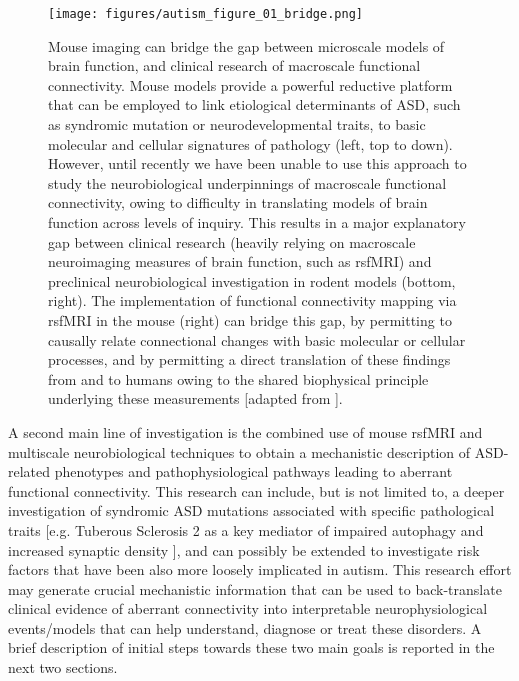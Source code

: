 \begin{figure}[th] \centering
    \texttt{[image: figures/autism\_figure\_01\_bridge.png]}
    \decoRule
    \caption[Mouse imaging can bridge
    the gap between microscale models of brain function, and clinical research
    of macroscale functional connectivity.]{Mouse imaging can bridge
    the gap between microscale models of brain function, and clinical research
    of macroscale functional connectivity. Mouse models provide a powerful
    reductive platform that can be employed to link etiological determinants of
    ASD, such as syndromic mutation or neurodevelopmental traits, to basic
    molecular and cellular signatures of pathology (left, top to down). However,
    until recently we have been unable to use this approach to study the
    neurobiological underpinnings of macroscale functional connectivity, owing
    to difficulty in translating models of brain function across levels of
    inquiry. This results in a major explanatory gap between clinical research
    (heavily relying on macroscale neuroimaging measures of brain function, such
    as rsfMRI) and preclinical neurobiological investigation in rodent models
    (bottom, right). The implementation of functional connectivity mapping via
    rsfMRI in the mouse (right) can bridge this gap, by permitting to causally
    relate connectional changes with basic molecular or cellular processes, and
    by permitting a direct translation of these findings from and to humans
    owing to the shared biophysical principle underlying these measurements
    [adapted from \parencite{arguello2012, anticevic2013}].}
    \label{fig:autism_fig01_bridge}
\end{figure}

A second main line of investigation is the combined use of mouse rsfMRI and
multiscale neurobiological techniques to obtain a mechanistic description of
ASD-related phenotypes and pathophysiological pathways leading to aberrant
functional connectivity. This research can include, but is not limited to, a
deeper investigation of syndromic ASD mutations associated with specific
pathological traits [e.g. Tuberous Sclerosis 2 as a key mediator of impaired
autophagy and increased synaptic density \parencite{tang2014}], and can possibly
be extended to investigate risk factors that have been also more loosely
implicated in autism. This research effort may generate crucial mechanistic
information that can be used to back-translate clinical evidence of aberrant
connectivity into interpretable neurophysiological events/models that can help
understand, diagnose or treat these disorders. A brief description of initial
steps towards these two main goals is reported in the next two sections.

